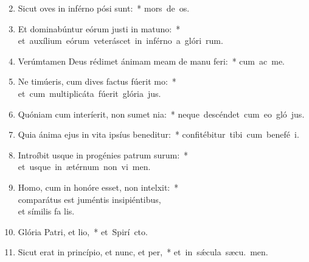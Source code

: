 \begin{flushleft}
\begin{enumerate}[leftmargin=*]
\setcounter{enumi}{1}

\item Sicut oves in inférno pósi sunt:~* \mbox{mors de os.}
\item Et dominabúntur eórum justi in matuno:~* \mbox{et auxílium eórum veteráscet in inférno a glóri rum.}
\item Verúmtamen Deus rédimet ánimam meam de manu feri:~* \mbox{cum ac me.}
\item Ne timúeris, cum dives factus fúerit mo:~* \mbox{et cum multiplicáta fúerit glória  jus.}
\item Quóniam cum interíerit, non sumet nia:~* \mbox{neque descéndet cum eo gló jus.}
\item Quia ánima ejus in vita ipsíus beneditur:~* \mbox{confitébitur tibi cum benefé i.}
\item Introíbit usque in progénies patrum surum:~* \mbox{et usque in ætérnum non vi men.}
\item Homo, cum in honóre esset, non intelxit:~* \\comparátus est juméntis insipiéntibus, \\et símilis fa  lis.
\item Glória Patri, et lio,~* \mbox{et Spirí cto.}
\item Sicut erat in princípio, et nunc, et per,~* \mbox{et in s\'{\ae}cula sæcu. men.}

\end{enumerate}
\end{flushleft}

